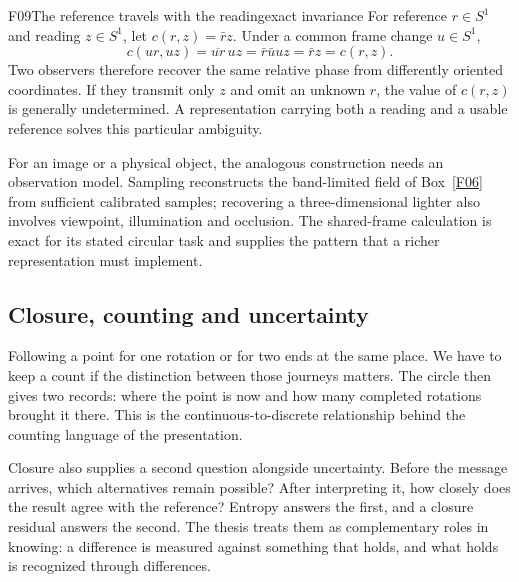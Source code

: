 \documentclass[11pt,a4paper]{article}
\begin{document}
\begin{formal}{F09}{The reference travels with the reading}{exact invariance}
For reference $r\in S^1$ and reading $z\in S^1$, let
$c(r,z)=\bar r z$. Under a common frame change $u\in S^1$,
\begin{equation}\label{eq:reference}
 c(ur,uz)=\overline{ur}\,uz=\bar r\bar uuz=\bar r z=c(r,z).
\end{equation}
Two observers therefore recover the same relative phase from differently
oriented coordinates. If they transmit only $z$ and omit an unknown $r$,
the value of $c(r,z)$ is generally undetermined. A representation carrying
both a reading and a usable reference solves this particular ambiguity.

For an image or a physical object, the analogous construction needs an
observation model. Sampling reconstructs the band-limited field of
Box~\ref{F06} from sufficient calibrated samples; recovering a three-dimensional
lighter also involves viewpoint, illumination and occlusion. The shared-frame
calculation is exact for its stated circular task and supplies the pattern
that a richer representation must implement.
\end{formal}

\subsection{Closure, counting and uncertainty}
Following a point for one rotation or for two ends at the same place. We have
to keep a count if the distinction between those journeys matters. The circle
then gives two records: where the point is now and how many completed
rotations brought it there. This is the continuous-to-discrete relationship
behind the counting language of the presentation.

Closure also supplies a second question alongside uncertainty. Before the
message arrives, which alternatives remain possible? After interpreting it,
how closely does the result agree with the reference? Entropy answers the
first, and a closure residual answers the second. The thesis treats them as
complementary roles in knowing: a difference is measured against something
that holds, and what holds is recognized through differences.
\end{document}
